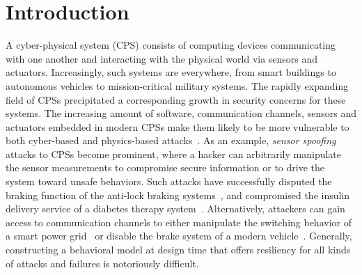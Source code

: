 \section{Introduction}
\label{sec:intro}
%
%
%
A cyber-physical system (CPS) consists of computing devices communicating with one another and interacting with the physical world via sensors and actuators. Increasingly, such systems are everywhere, from smart buildings to autonomous vehicles to mission-critical military systems. 
%
The rapidly expanding field of CPSs precipitated a corresponding growth in security concerns for these systems. The increasing amount of software, communication channels, sensors and actuators embedded in modern CPSs make them likely to be more vulnerable to both cyber-based and physics-based attacks~\cite{wan2015security, wasicek2014aspect, kocher2004security, al2015design, gamage2010enforcing}. As an example, \emph{sensor spoofing} attacks to CPSs become prominent, where a hacker can arbitrarily manipulate the sensor measurements to compromise secure information or to drive the system toward unsafe behaviors. Such attacks have successfully disputed the braking function of the anti-lock braking systems~\cite{Shoukry2013,al2015design}, and compromised the insulin delivery service of a diabetes therapy system~\cite{li2011hijacking}. Alternatively, attackers can gain access to communication channels to either manipulate the switching behavior of a smart power grid~\cite{liu2011class} or disable the brake system of a modern vehicle~\cite{koscher2010experimental}. Generally, constructing a behavioral model at design time that offers resiliency for all kinds of attacks and failures is notoriously difficult. 
%

